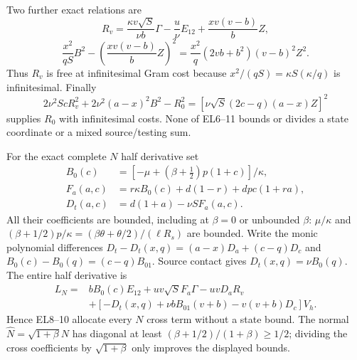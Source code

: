 Two further exact relations are
\[
 R_v=\frac{\kappa v\sqrt S}{\nu b}\Gamma
       -\frac u\nu E_{12}+\frac{xv(v-b)}bZ,          \tag{EL9}
\]
\[
 \frac{x^2}{qS}B^2-
       \left(\frac{xv(v-b)}bZ\right)^2
   =\frac{x^2}{q}(2vb+b^2)(v-b)^2Z^2.              \tag{EL10}
\]
Thus $R_v$ is free at infinitesimal Gram cost because
$x^2/(qS)=\kappa S(\kappa/q)$ is infinitesimal.  Finally
\[
 2\nu^2ScR_v^2+2\nu^2(a-x)^2B^2-R_0^2
       =[\nu\sqrt S(2c-q)(a-x)Z]^2               \tag{EL11}
\]
supplies $R_0$ with infinitesimal costs.  None of EL6--11 bounds or
divides a state coordinate or a mixed source/testing sum.

For the exact complete $N$ half derivative set
\[
\begin{aligned}
 B_0(c)&=[-\mu+(\beta+\tfrac12)p(1+c)]/\kappa,\\
 F_a(a,c)&=r\kappa B_0(c)+d(1-r)+dpc(1+ra),\\
 D_t(a,c)&=d(1+a)-\nu S F_a(a,c).
\end{aligned}                                                     \tag{EL12}
\]
All their coefficients are bounded, including at $\beta=0$ or
unbounded $\beta$: $\mu/\kappa$ and
$(\beta+1/2)p/\kappa=(\beta\theta+\theta/2)/(\ell R_s)$
are bounded.  Write the monic polynomial differences
$D_t-D_t(x,q)=(a-x)D_a+(c-q)D_c$ and
$B_0(c)-B_0(q)=(c-q)B_{01}$.  Source contact gives
$D_t(x,q)=\nu B_0(q)$.  The entire half derivative is
\[
\begin{aligned}
 L_N={}&bB_0(c)E_{12}+uv\sqrt S F_a\Gamma-uvD_aR_v\\
 &+[-D_t(x,q)+\nu bB_{01}(v+b)-v(v+b)D_c]V_h.
\end{aligned}                                                     \tag{EL13}
\]
Hence EL8--10 allocate every $N$ cross term without a state bound.
The normal $\widehat N=\sqrt{1+\beta}N$ has diagonal at least
$(\beta+1/2)/(1+\beta)\ge1/2$; dividing the cross coefficients
by $\sqrt{1+\beta}$ only improves the displayed bounds.

